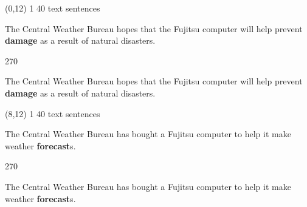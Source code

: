 \documentclass[a4paper]{article}
\newenvironment{itemize*}%
{\begin{itemize}%
 \setlength{\itemsep}{0.5cm}%
 \setlength{\parsep}{0pt}%
 \setlength{\parskip}{0pt}}%
{\end{itemize}}
\newcommand{\mycard}[3]{%
	\small #1 #2
	\par
	\parbox[t][6.8cm][c]{9.5cm}{%
	\par
	\myleft{#3}
	\par
	\myright{#3}
	}
}
\newcommand{\myleft}[1]{%
	\begin{sideways}
	\hspace*{-0.9cm}
		\parbox[t][2.7cm][t]{6.5cm}{%
		\large #1
		}
	\end{sideways}
}
\newcommand{\myright}[1]{%
	\hspace*{6.5cm}
	\begin{turn}{270}
	\hspace*{-7.1cm}
		\parbox[t][2.7cm][t]{6.5cm}{%
		\large #1
		}
	\end{turn}
}
\begin{document}
\begin{textblock}{8}(0,12)
\mycard{1}{40 text sentences}{
\begin{itemize*}
\item The Central Weather Bureau hopes that the Fujitsu computer will help prevent \textbf{damage} as a result of natural disasters.
\end{itemize*}
}
\end{textblock}

\begin{textblock}{8}(8,12)
\mycard{1}{40 text sentences}{
\begin{itemize*}
\item The Central Weather Bureau has bought a Fujitsu computer to help it make weather \textbf{forecast}s.
\end{itemize*}
}
\end{textblock}

\null
\newpage
\end{document}
